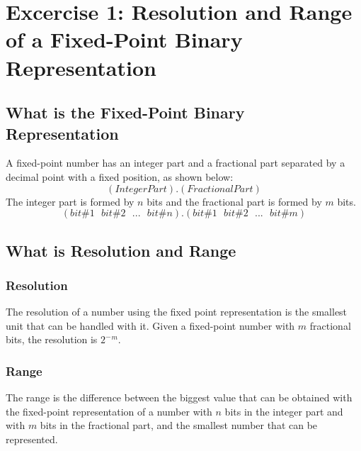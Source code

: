 %


\section{\color{olive}Excercise 1: Resolution and Range of a Fixed-Point Binary Representation}

\subsection{\color{purple}What is the Fixed-Point Binary Representation}
A fixed-point number has an integer part and a fractional part separated by a decimal point with a fixed position, as shown below:
$$ (Integer Part).(Fractional Part)$$
The integer part is formed by $n$ bits and the fractional part is formed by $m$ bits.
$$ (bit \#1\ \ \ bit \#2\ \ \ ...\ \ \ bit \#n).(bit \#1\ \ \ bit \#2\ \ \ ...\ \ \ bit \#m)$$

\subsection{\color{purple}What is Resolution and Range}
\subsubsection{\color{red}Resolution}
The resolution of a number using the fixed point representation is the smallest unit that can be handled with it.
Given a fixed-point number with $m$ fractional bits, the resolution is $2^- $$^m$. %
\subsubsection{\color{red}Range}
The range is the difference between the biggest value that can be obtained with the fixed-point representation of a number with $n$ bits in the integer part and with $m$ bits in the fractional part, and the smallest number that can be represented.

